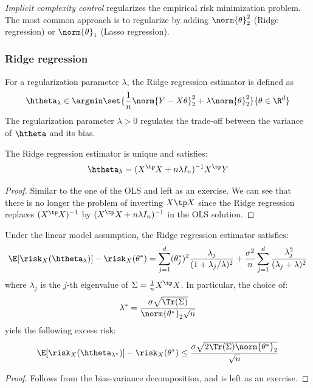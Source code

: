 \documentclass{../cs-classes/cs-classes}
\begin{document}
\emph{Implicit complexity control} regularizes the empirical risk minimization problem. The most common approach is to regularize by adding $\norm{\theta}^2_2$ (Ridge regression) or $\norm{\theta}_1$ (Lasso regression).

\subsubsection{Ridge regression}
\begin{definition}
    For a regularization parameter $\lambda$, the Ridge regression estimator is defined as
    \begin{equation}
        \htheta_\lambda \in \argmin\set{\frac{1}{n}\norm{Y-X\theta}^2_2+\lambda\norm{\theta}^2_2}{\theta\in\R^d}
    \end{equation}
    The regularization parameter $\lambda>0$ regulates the trade-off between the variance of $\htheta$ and its bias.
\end{definition}

\begin{property}
    The Ridge regression estimator is unique and satisfies:
    \begin{equation*}
        \htheta_\lambda = (X^\tp X+n\lambda I_n)^{-1}X^\tp Y
    \end{equation*}
\end{property}
\begin{proof}
    Similar to the one of the OLS and left as an exercise. We can see that there is no longer the problem of inverting $X\tp X$ since the Ridge regression replaces $(X^\tp X)^{-1}$ by $(X^\tp X+n\lambda I_n)^{-1}$ in the OLS solution.
\end{proof}

\begin{property}
    Under the linear model assumption, the Ridge regression estimator satisfies:
    \begin{equation*}
        \E[\risk_X(\htheta_\lambda)]-\risk_X(\theta^*) = \sum_{j=1}^d(\theta_j^*)^2\frac{\lambda_j}{(1+\lambda_j/\lambda)^2} + \frac{\sigma^2}{n}\sum_{j=1}^d\frac{\lambda_j^2}{(\lambda_j+\lambda)^2}
    \end{equation*}
    where $\lambda_j$ is the $j$-th eigenvalue of $\Sigma=\frac{1}{n}X^\tp X$. In particular, the choice of:
    \begin{equation*}
        \lambda^* = \frac{\sigma\sqrt{\Tr(\Sigma)}}{\norm{\theta^*}_2\sqrt{n}}
    \end{equation*}
    yiels the following excess risk:
    \begin{equation*}
        \E[\risk_X(\htheta_{\lambda^*})]-\risk_X(\theta^*) \leq \frac{\sigma\sqrt{2\Tr(\Sigma)\norm{\theta^*}_2}}{\sqrt{n}}
    \end{equation*}
\end{property}
\begin{proof}
    Follows from the bias-variance decomposition, and is left as an exercise.
\end{proof}
\end{document}

